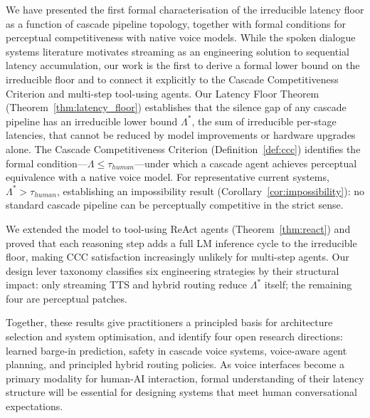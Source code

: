 We have presented the first formal characterisation of the irreducible latency floor as a function of cascade pipeline topology, together with formal conditions for perceptual competitiveness with native voice models.
While the spoken dialogue systems literature \citep{schlangen2011general,skantze2021turn} motivates streaming as an engineering solution to sequential latency accumulation, our work is the first to derive a formal lower bound on the irreducible floor and to connect it explicitly to the Cascade Competitiveness Criterion and multi-step tool-using agents.
Our Latency Floor Theorem (Theorem~\ref{thm:latency_floor}) establishes that the silence gap of any cascade pipeline has an irreducible lower bound $\Lambda^*$, the sum of irreducible per-stage latencies, that cannot be reduced by model improvements or hardware upgrades alone.
The Cascade Competitiveness Criterion (Definition~\ref{def:ccc}) identifies the formal condition---$\Lambda \leq \tau_{human}$---under which a cascade agent achieves perceptual equivalence with a native voice model.
For representative current systems, $\Lambda^* > \tau_{human}$, establishing an impossibility result (Corollary~\ref{cor:impossibility}): no standard cascade pipeline can be perceptually competitive in the strict sense.

We extended the model to tool-using ReAct agents (Theorem~\ref{thm:react}) and proved that each reasoning step adds a full LM inference cycle to the irreducible floor, making CCC satisfaction increasingly unlikely for multi-step agents.
Our design lever taxonomy classifies six engineering strategies by their structural impact: only streaming TTS and hybrid routing reduce $\Lambda^*$ itself; the remaining four are perceptual patches.

Together, these results give practitioners a principled basis for architecture selection and system optimisation, and identify four open research directions: learned barge-in prediction, safety in cascade voice systems, voice-aware agent planning, and principled hybrid routing policies.
As voice interfaces become a primary modality for human-AI interaction, formal understanding of their latency structure will be essential for designing systems that meet human conversational expectations.
